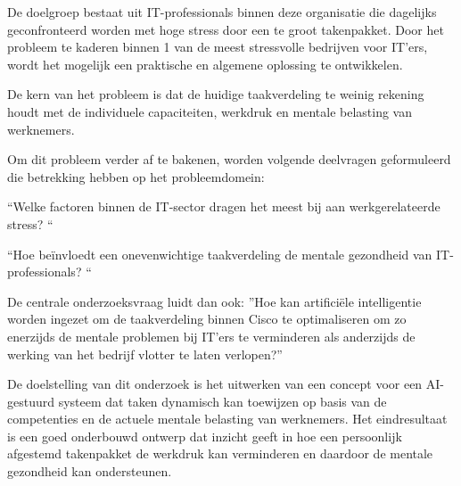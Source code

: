 \vspace{1em}De doelgroep bestaat uit IT-professionals binnen deze organisatie die dagelijks geconfronteerd worden met hoge stress door een te groot takenpakket. Door het probleem te kaderen binnen 1 van de meest stressvolle bedrijven voor IT'ers, wordt het mogelijk een praktische en algemene oplossing te ontwikkelen.

\vspace{1em}De kern van het probleem is dat de huidige taakverdeling te weinig rekening houdt met de individuele capaciteiten, werkdruk en mentale belasting van werknemers.

\vspace{1em}Om dit probleem verder af te bakenen, worden volgende deelvragen geformuleerd die betrekking hebben op het probleemdomein:

\vspace{0.5em}``Welke factoren binnen de IT-sector dragen het meest bij aan werkgerelateerde stress? ``


\vspace{0.5em}``Hoe beïnvloedt een onevenwichtige taakverdeling de mentale gezondheid van IT-professionals? ``

\vspace{1em}De centrale onderzoeksvraag luidt dan ook: ''Hoe kan artificiële intelligentie worden ingezet om de taakverdeling binnen Cisco te optimaliseren om zo enerzijds de mentale problemen bij IT'ers te verminderen als anderzijds de werking van het bedrijf vlotter te laten verlopen?''

\vspace{1em}De doelstelling van dit onderzoek is het uitwerken van een concept voor een AI-gestuurd systeem dat taken dynamisch kan toewijzen op basis van de competenties en de actuele mentale belasting van werknemers. Het eindresultaat is een goed onderbouwd ontwerp dat inzicht geeft in hoe een persoonlijk afgestemd takenpakket de werkdruk kan verminderen en daardoor de mentale gezondheid kan ondersteunen. 



